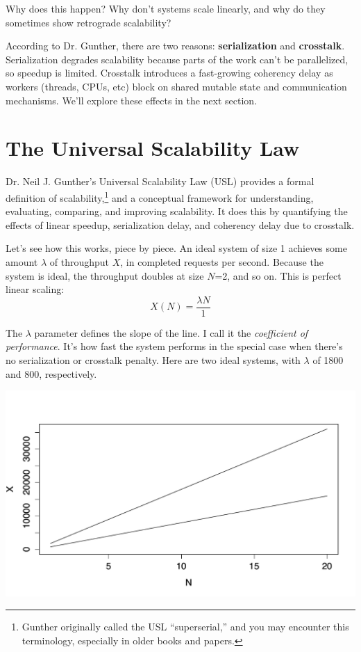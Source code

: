 \documentclass{vivid_layout}
\begin{document}
Why does this happen? Why don't systems scale linearly, and why do they
sometimes show retrograde scalability?

According to Dr. Gunther, there are two reasons: {\bfseries serialization} and
{\bfseries crosstalk}. Serialization degrades scalability because parts of the
work can't be parallelized, so speedup is limited. Crosstalk introduces a
fast-growing coherency delay as workers (threads, CPUs, etc) block on shared
mutable state and communication mechanisms. We'll explore these effects in the
next section.

\section{The Universal Scalability Law}

Dr. Neil J. Gunther's Universal Scalability Law (USL) provides a formal
definition of scalability,\footnote{Gunther originally called the USL
``superserial,'' and you may encounter this terminology, especially in older
books and papers.} and a conceptual framework for understanding,
evaluating, comparing, and improving scalability. It does this by quantifying
the effects of linear speedup, serialization delay, and coherency delay due to
crosstalk.

Let's see how this works, piece by piece. An ideal system of size 1
achieves some amount $\lambda$ of throughput $X$, in completed requests per
second. Because the system is ideal, the throughput doubles at size $N$=2, and so
on. This is perfect linear scaling:
\[
X(N) = \frac{\lambda N}{1}
\]

The $\lambda$ parameter defines the slope of the line. I call it the {\itshape
coefficient of performance}. It's how fast the system performs in the special
case when there's no serialization or crosstalk penalty.
Here are two ideal systems, with $\lambda$ of 1800 and 800, respectively.
\begin{center}
\includegraphics[width=.85\linewidth]{scalability/ideal-linear}
\end{center}
\end{document}
